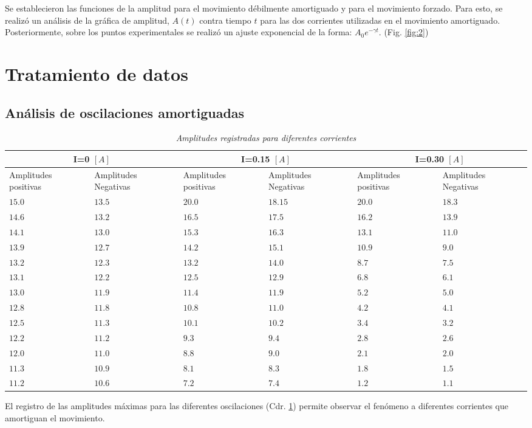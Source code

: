 \documentclass[spanish,notitlepage,letterpaper, 12pt]{article}
\begin{document}
Se establecieron las funciones de la amplitud para el movimiento
débilmente amortiguado y para el movimiento forzado. Para esto, se realizó un análisis
de la gráfica de amplitud, $A(t)$ contra tiempo $t$ para las dos
corrientes utilizadas en el movimiento amortiguado. Posteriormente, sobre los puntos
experimentales se realizó un ajuste exponencial de la forma: $A_0e^{-\gamma t}$. (Fig. \ref{fig:2})
\newpage
\section{Tratamiento de datos} \label{TD}
\subsection{Análisis de oscilaciones amortiguadas}
\begin{table}[ht]
    \centering
    \begin{tabular}{|m{2cm}|m{2cm}|m{2cm}|m{2cm}|m{2cm}|m{2cm}|}
        \hline
        \multicolumn{2}{|c|}{I=0 $[A]$} & \multicolumn{2}{|c|}{I=0.15 $[A]$} & \multicolumn{2}{|c|}{I=0.30 $[A]$}\\
        \hline \hline
        Amplitudes positivas&Amplitudes Negativas&  Amplitudes positivas& Amplitudes Negativas& Amplitudes positivas& Amplitudes Negativas\\
        \hline
        $15.0$ & $13.5$ & $20.0$ & $18.15$ & $20.0$ & $18.3$\\
        $14.6$ & $13.2$ & $16.5$ & $17.5$ & $16.2$ & $13.9$\\
        $14.1$ & $13.0$ & $15.3$ & $16.3$ & $13.1$ & $11.0$\\
        $13.9$ & $12.7$ & $14.2$ & $15.1$ & $10.9$ & $9.0$\\
        $13.2$ & $12.3$ & $13.2$ & $14.0$ & $8.7$ & $7.5$\\
        $13.1$ & $12.2$ & $12.5$ & $12.9$ & $6.8$ & $6.1$\\
        $13.0$ & $11.9$ & $11.4$ & $11.9$ & $5.2$ & $5.0$\\
        $12.8$ & $11.8$ & $10.8$ & $11.0$ & $4.2$ & $4.1$\\ 
        $12.5$ & $11.3$ & $10.1$ & $10.2$ & $3.4$ & $3.2$\\ 
        $12.2$ & $11.2$ & $9.3$ & $9.4$ & $2.8$ & $2.6$\\ 
        $12.0$ & $11.0$ & $8.8$ & $9.0$ & $2.1$ & $2.0$\\ 
        $11.3$ & $10.9$ & $8.1$ & $8.3$ & $1.8$ & $1.5$\\ 
        $11.2$ & $10.6$ & $7.2$ & $7.4$ & $1.2$ & $1.1$\\
        \hline
    \end{tabular}
    \caption{\textit{Amplitudes registradas para diferentes corrientes}}
    \label{Table 1}
\end{table}
El registro de las amplitudes máximas para las diferentes oscilaciones (Cdr. \ref{Table 1}) permite observar el fenómeno a diferentes corrientes que amortiguan el movimiento.
\end{document}
